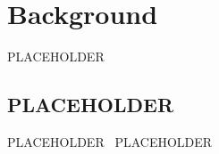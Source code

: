 \chapter{Background}\label{ch:background}

PLACEHOLDER

\section{PLACEHOLDER}

PLACEHOLDER~\cite{Noo05} PLACEHOLDER

